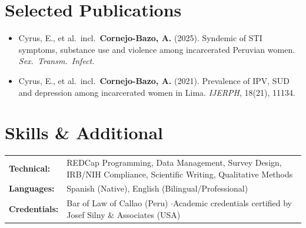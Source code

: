 \documentclass[10pt,letterpaper]{article}
\begin{document}
\section{Selected Publications}

\begin{itemize}
  \item Cyrus, E., et al.\ incl.\ \textbf{Cornejo-Bazo, A.} (2025). Syndemic of STI symptoms, substance use and violence among incarcerated Peruvian women. \textit{Sex.\ Transm.\ Infect.}
  \item Cyrus, E., et al.\ incl.\ \textbf{Cornejo-Bazo, A.} (2021). Prevalence of IPV, SUD and depression among incarcerated women in Lima. \textit{IJERPH}, 18(21), 11134.
\end{itemize}
\vspace{0.2em}

\section{Skills \& Additional}

\begin{tabularx}{\textwidth}{@{}l X@{}}
\textbf{Technical:} & REDCap Programming, Data Management, Survey Design, IRB/NIH Compliance, Scientific Writing, Qualitative Methods \\
\textbf{Languages:} & Spanish (Native), English (Bilingual/Professional) \\
\textbf{Credentials:} & Bar of Law of Callao (Peru) \quad$\cdot$\quad Academic credentials certified by Josef Silny \& Associates (USA) \\
\end{tabularx}
\end{document}
